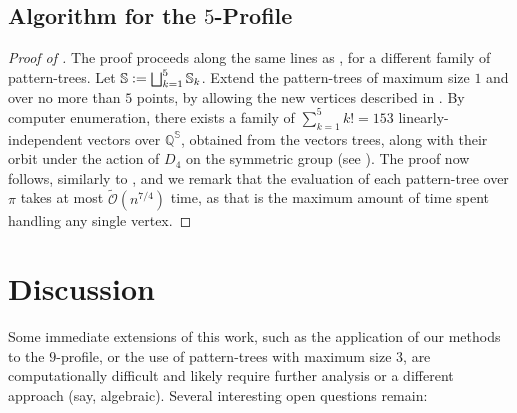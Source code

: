 \documentclass{article}
\newcommand{\QQ}{\mathbb{Q}}
\newcommand{\eqdef}{\vcentcolon=}
\theoremstyle{remark}
\newcommand{\Otilde}[1]{\widetilde{\mathcal{O}}\left( #1 \right)}
\theoremstyle{plain}
\begin{document}
\subsection{Algorithm for the \texorpdfstring{$5$}{5}-Profile}

\begin{proof} [Proof of ]
    The proof proceeds along the same lines as , for a different family of pattern-trees.
    Let $\mathbb{S}\eqdef \bigsqcup_{k=1}^5 \mathbb{S}_k$.
    Extend the pattern-trees of maximum size $1$ and over no more than $5$ points,
    by allowing the new vertices described in .
    By computer enumeration, there exists a family of $\sum_{k=1}^5 k!=153$ linearly-independent vectors over $\QQ^\mathbb{S}$,
    obtained from the vectors trees,
    along with their orbit under the action of $D_4$ on the symmetric group (see ).
    The proof now follows, similarly to ,
    and we remark that the evaluation of each pattern-tree over $\pi$
    takes at most $\Otilde{n^{7/4}}$ time, as that is the maximum amount of time spent handling any single vertex.
\end{proof}
    
\pagebreak
 \section{Discussion}
Some immediate extensions of this work, such as the application of our methods to the $9$-profile,
or the use of pattern-trees with maximum size $3$,
are computationally difficult and likely require further analysis or a different approach (say, algebraic).
Several interesting open questions remain:
\end{document}
